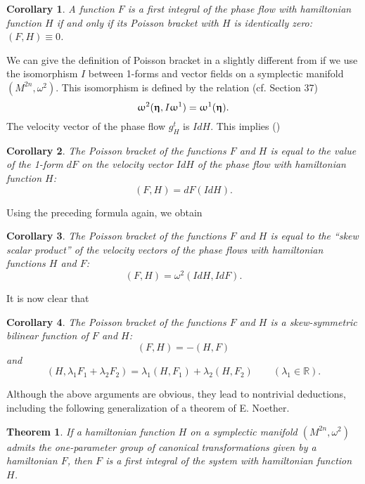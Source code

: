 \documentclass[leqno]{report}
\renewcommand{\pmb}[1]{{
  \renewcommand{\alpha}{\upalpha}
  \renewcommand{\beta}{\upbeta}
  \renewcommand{\gamma}{\upgamma}
  \renewcommand{\delta}{\updelta}
  \renewcommand{\epsilon}{\upepsilon}
  \renewcommand{\varepsilon}{\upvarepsilon}
  \renewcommand{\zeta}{\upzeta}
  \renewcommand{\eta}{\upeta}
  \renewcommand{\theta}{\uptheta}
  \renewcommand{\iota}{\upiota}
  \renewcommand{\kappa}{\upkappa}
  \renewcommand{\lambda}{\uplambda}
  \renewcommand{\mu}{\upmu}
  \renewcommand{\nu}{\upnu}
  \renewcommand{\xi}{\upxi}
  \renewcommand{\pi}{\uppi}
  \renewcommand{\rho}{\uprho}
  \renewcommand{\sigma}{\upsigma}
  \renewcommand{\tau}{\uptau}
  \renewcommand{\upsilon}{\upupsilon}
  \renewcommand{\varphi}{\upvarphi}
  \renewcommand{\phi}{\upphi}
  \renewcommand{\chi}{\upchi}
  \renewcommand{\psi}{\uppsi}
  \renewcommand{\omega}{\upomega}
  \boldsymbol{#1}
}}
\numberwithin{equation}{section}
\theoremstyle{plain}
\newtheorem{cor}{Corollary}
\newtheorem*{thm*}{Theorem}
\theoremstyle{definition}
\theoremstyle{remark}
\theoremstyle{smallcap}
\numberwithin{prob}{section}
\begin{document}
\begin{cor}
  A function $F$ is a first integral of the phase flow
  with hamiltonian function $H$ if and only if its Poisson bracket
  with $H$ is identically zero: $(F, H) \equiv 0$.
\end{cor}

We can give the definition of Poisson bracket in a slightly
different from if we use the isomorphism $I$ between 1-forms
and vector fields on a symplectic manifold $(M^{2n}, \omega^2)$.
%
%
This isomorphism is defined by the relation (cf. Section 37)
$$
\omega^2(\pmb\eta, I\omega^1)
=
\omega^1(\pmb\eta).
$$
The velocity vector of the phase flow $g_H^t$ is $IdH$.
This implies
(\note{$\omega^1 = dF$, $\pmb\eta = IdH$.})

\begin{cor}
  The Poisson bracket of the functions $F$ and $H$
  is equal to the value of the 1-form $dF$
  on the velocity vector $IdH$ of the phase flow with
  hamiltonian function $H$:
  $$
  (F, H) = dF(IdH).
  $$
\end{cor}

Using the preceding formula again, we obtain

\begin{cor}
  The Poisson bracket of the functions $F$ and $H$ is equal to the
  ``skew scalar product'' of the velocity vectors of the phase flows
  with hamiltonian functions $H$ and $F$:
  $$
  (F, H) = \omega^2(IdH, IdF).
  $$
\end{cor}

It is now clear that

\begin{cor}
  The Poisson bracket of the functions $F$ and $H$
  is a skew-symmetric bilinear function of $F$ and $H$:
  $$
  (F, H) = -(H, F)
  $$
  and
  $$
  (H, \lambda_1 F_1 + \lambda_2 F_2)
  =
  \lambda_1 (H, F_1)
  +
  \lambda_2 (H, F_2)
  \qquad
  (\lambda_1 \in \mathbb R).
  $$
\end{cor}

Although the above arguments are obvious,
they lead to nontrivial deductions,
including the following generalization
of a theorem of E. Noether.

\begin{thm*}
  If a hamiltonian function $H$ on a symplectic manifold $(M^{2n}, \omega^2)$
  admits the one-parameter group of canonical transformations
  given by a hamiltonian $F$,
  then $F$ is a first integral of the system with hamiltonian function $H$.
\end{thm*}
\end{document}
